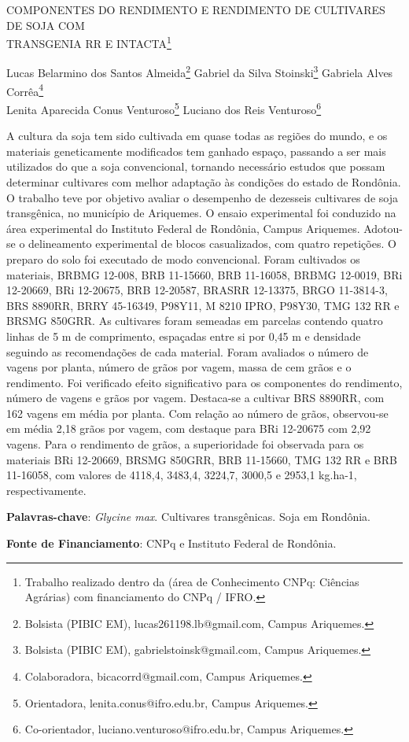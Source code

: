 \documentclass[article,12pt,onesidea,4paper,english,brazil]{abntex2}
\begin{document}
	
	
	\frenchspacing 
	
	\begin{center}
		\LARGE COMPONENTES DO RENDIMENTO E RENDIMENTO DE CULTIVARES DE SOJA
		COM \\TRANSGENIA RR E INTACTA\footnote{Trabalho realizado dentro da (área de Conhecimento CNPq: Ciências Agrárias) com financiamento
			do CNPq / IFRO.}
		
		\normalsize
	Lucas Belarmino dos Santos Almeida\footnote{Bolsista (PIBIC EM), lucas261198.lb@gmail.com, Campus Ariquemes.} 
		Gabriel da Silva Stoinski\footnote{Bolsista (PIBIC EM), gabrielstoinsk@gmail.com, Campus Ariquemes.} 
		Gabriela Alves Corrêa\footnote{Colaboradora, bicacorrd@gmail.com, Campus Ariquemes.} \\
	Lenita
	Aparecida Conus Venturoso\footnote{Orientadora, lenita.conus@ifro.edu.br, Campus Ariquemes.}
	Luciano dos Reis Venturoso\footnote{Co-orientador, luciano.venturoso@ifro.edu.br, Campus Ariquemes.}
	 
	\end{center}
	
	\noindent A cultura da soja tem sido cultivada em quase todas as regiões do mundo, e os
	materiais geneticamente modificados tem ganhado espaço, passando a ser mais
	utilizados do que a soja convencional, tornando necessário estudos que possam
	determinar cultivares com melhor adaptação às condições do estado de Rondônia.
	O trabalho teve por objetivo avaliar o desempenho de dezesseis cultivares de soja
	transgênica, no município de Ariquemes. O ensaio experimental foi conduzido na
	área experimental do Instituto Federal de Rondônia, Campus Ariquemes. Adotou-se
	o delineamento experimental de blocos casualizados, com quatro repetições. O
	preparo do solo foi executado de modo convencional. Foram cultivados os materiais,
	BRBMG 12-008, BRB 11-15660, BRB 11-16058, BRBMG 12-0019, BRi 12-20669,
	BRi 12-20675, BRB 12-20587, BRASRR 12-13375, BRGO 11-3814-3, BRS 8890RR,
	BRRY 45-16349, P98Y11, M 8210 IPRO, P98Y30, TMG 132 RR e BRSMG 850GRR.
	As cultivares foram semeadas em parcelas contendo quatro linhas de 5 m de
	comprimento, espaçadas entre si por 0,45 m e densidade seguindo as
	recomendações de cada material. Foram avaliados o número de vagens por planta,
	número de grãos por vagem, massa de cem grãos e o rendimento. Foi verificado
	efeito significativo para os componentes do rendimento, número de vagens e grãos
	por vagem. Destaca-se a cultivar BRS 8890RR, com 162 vagens em média por
	planta. Com relação ao número de grãos, observou-se em média 2,18 grãos por
	vagem, com destaque para BRi 12-20675 com 2,92 vagens. Para o rendimento de
	grãos, a superioridade foi observada para os materiais BRi 12-20669, BRSMG
	850GRR, BRB 11-15660, TMG 132 RR e BRB 11-16058, com valores de 4118,4,
	3483,4, 3224,7, 3000,5 e 2953,1 kg.ha-1, respectivamente.
	
	\vspace{\onelineskip}
	
	\noindent
	\textbf{Palavras-chave}: \textit{Glycine max}. Cultivares transgênicas. Soja em Rondônia. 
	
	\noindent
	\textbf{Fonte de Financiamento}: CNPq e Instituto Federal de Rondônia.
	
\end{document}
